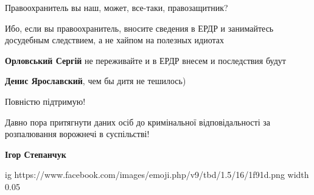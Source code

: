 \begin{itemize}
\begin{itemize}
\end{itemize}

 

Правоохранитель вы наш, может, все-таки, правозащитник?

Ибо, если вы правоохранитель, вносите сведения в ЕРДР и занимайтесь досудебным
следствием, а не хайпом на полезных идиотах

\begin{itemize}
 
\textbf{Орловський Сергій} не переживайте и в ЕРДР внесем и последствия будут

 
\textbf{Денис Ярославский}, чем бы дитя не тешилось)
\end{itemize}

 

Повністю підтримую!

Давно пора притягнути даних осіб до кримінальної відповідальності за розпалювання ворожнечі в суспільстві!

\begin{itemize}

 
\textbf{Ігор Степанчук} 

\ifcmt
  ig https://www.facebook.com/images/emoji.php/v9/tbd/1.5/16/1f91d.png
  width 0.05
\fi


\end{itemize}
\end{itemize}
